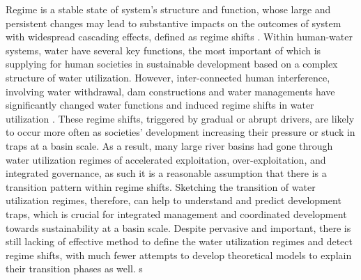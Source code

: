 \documentclass[9pt, twocolumn, twoside, lineno]{pnas-new}
\begin{document}
Regime is a stable state of system’s structure and function, whose large and persistent changes may lead to substantive impacts on the outcomes of system with widespread cascading effects, defined as regime shifts \cite{rochaCascadingRegimeShifts2018a}.
Within human-water systems, water have several key functions, the most important of which is supplying for human societies in sustainable development based on a complex structure of water utilization. 
However, inter-connected human interference, involving water withdrawal, dam constructions and water managements have significantly changed water functions and induced regime shifts in water utilization
\cite{falkenmarkUnderstandingWaterResilience2019}.
These regime shifts, triggered by gradual or abrupt drivers, are likely to occur more often as societies' development increasing their pressure or stuck in traps at a basin scale.
As a result, many large river basins had gone through water utilization regimes of accelerated exploitation, over-exploitation, and integrated governance, as such it is a reasonable assumption that there is a transition pattern within regime shifts. 
Sketching the transition of water utilization regimes, therefore, can help to understand and predict development traps, which is crucial for integrated management and coordinated development towards sustainability at a basin scale.
Despite pervasive and important, there is still lacking of effective method to define the water utilization regimes and detect regime shifts, with much fewer attempts to develop theoretical models to explain their transition phases as well. 
s
\end{document}
